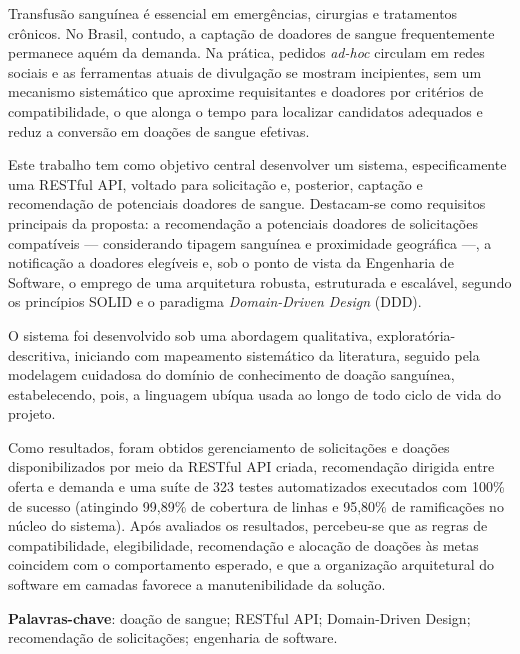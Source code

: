 \documentclass[
  12pt,
  oneside,              %
  openany,
  a4paper,
  english,
  brazilian
]{abntex2}
\renewcommand{\listtablename}{Lista de tabelas}
\begin{document}
\listoffigures*
\clearpage

\pdfbookmark[0]{\listtablename}{lot}
\listoftables*
\clearpage

\begin{resumo}
  Transfusão sanguínea é essencial em emergências, cirurgias e tratamentos crônicos. No Brasil, contudo, a captação de doadores de sangue frequentemente permanece aquém da demanda. Na prática, pedidos \textit{ad-hoc} circulam em redes sociais e as ferramentas atuais de divulgação se mostram incipientes, sem um mecanismo sistemático que aproxime requisitantes e doadores por critérios de compatibilidade, o que alonga o tempo para localizar candidatos adequados e reduz a conversão em doações de sangue efetivas.

  Este trabalho tem como objetivo central desenvolver um sistema, especificamente uma RESTful API, voltado para solicitação e, posterior, captação e recomendação de potenciais doadores de sangue. Destacam-se como requisitos principais da proposta: a recomendação a potenciais doadores de solicitações compatíveis --- considerando tipagem sanguínea e proximidade geográfica ---, a notificação a doadores elegíveis e, sob o ponto de vista da Engenharia de Software, o emprego de uma arquitetura robusta, estruturada e escalável, segundo os princípios SOLID e o paradigma \textit{Domain-Driven Design} (DDD).

  O sistema foi desenvolvido sob uma abordagem qualitativa, exploratória-descritiva, iniciando com mapeamento sistemático da literatura, seguido pela modelagem cuidadosa do domínio de conhecimento de doação sanguínea, estabelecendo, pois, a linguagem ubíqua usada ao longo de todo ciclo de vida do projeto.

  Como resultados, foram obtidos gerenciamento de solicitações e doações disponibilizados por meio da RESTful API criada, recomendação dirigida entre oferta e demanda e uma suíte de 323 testes automatizados executados com 100\% de sucesso (atingindo 99,89\% de cobertura de linhas e 95,80\% de ramificações no núcleo do sistema). Após avaliados os resultados, percebeu-se que as regras de compatibilidade, elegibilidade, recomendação e alocação de doações às metas coincidem com o comportamento esperado, e que a organização arquitetural do software em camadas favorece a manutenibilidade da solução.

  \vspace{\onelineskip}
  \noindent
  \textbf{Palavras-chave}: doação de sangue; RESTful API; Domain-Driven Design; recomendação de solicitações; engenharia de software.
\end{resumo}
\end{document}
